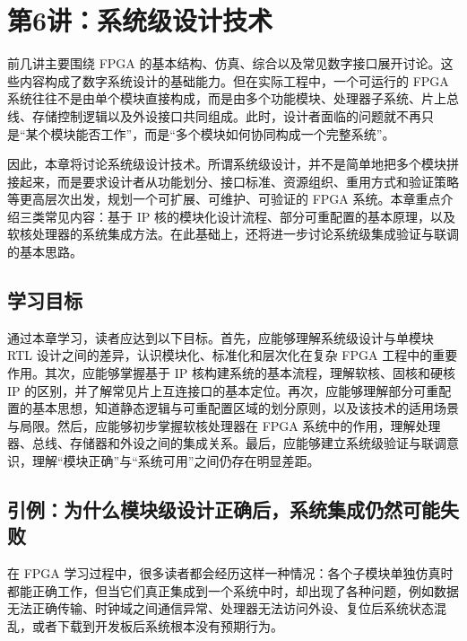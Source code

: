 \chapter{第6讲：系统级设计技术}\label{ux7b2c6ux8bb2ux7cfbux7edfux7ea7ux8bbeux8ba1ux6280ux672f}

前几讲主要围绕 FPGA
的基本结构、仿真、综合以及常见数字接口展开讨论。这些内容构成了数字系统设计的基础能力。但在实际工程中，一个可运行的
FPGA
系统往往不是由单个模块直接构成，而是由多个功能模块、处理器子系统、片上总线、存储控制逻辑以及外设接口共同组成。此时，设计者面临的问题就不再只是``某个模块能否工作''，而是``多个模块如何协同构成一个完整系统''。

因此，本章将讨论系统级设计技术。所谓系统级设计，并不是简单地把多个模块拼接起来，而是要求设计者从功能划分、接口标准、资源组织、重用方式和验证策略等更高层次出发，规划一个可扩展、可维护、可验证的
FPGA 系统。本章重点介绍三类常见内容：基于 IP
核的模块化设计流程、部分可重配置的基本原理，以及软核处理器的系统集成方法。在此基础上，还将进一步讨论系统级集成验证与联调的基本思路。

\section{学习目标}\label{ux5b66ux4e60ux76eeux6807}

通过本章学习，读者应达到以下目标。首先，应能够理解系统级设计与单模块 RTL
设计之间的差异，认识模块化、标准化和层次化在复杂 FPGA
工程中的重要作用。其次，应能够掌握基于 IP
核构建系统的基本流程，理解软核、固核和硬核 IP
的区别，并了解常见片上互连接口的基本定位。再次，应能够理解部分可重配置的基本思想，知道静态逻辑与可重配置区域的划分原则，以及该技术的适用场景与局限。然后，应能够初步掌握软核处理器在
FPGA
系统中的作用，理解处理器、总线、存储器和外设之间的集成关系。最后，应能够建立系统级验证与联调意识，理解``模块正确''与``系统可用''之间仍存在明显差距。

\section{引例：为什么模块级设计正确后，系统集成仍然可能失败}\label{ux5f15ux4f8bux4e3aux4ec0ux4e48ux6a21ux5757ux7ea7ux8bbeux8ba1ux6b63ux786eux540eux7cfbux7edfux96c6ux6210ux4ecdux7136ux53efux80fdux5931ux8d25}

在 FPGA
学习过程中，很多读者都会经历这样一种情况：各个子模块单独仿真时都能正确工作，但当它们真正集成到一个系统中时，却出现了各种问题，例如数据无法正确传输、时钟域之间通信异常、处理器无法访问外设、复位后系统状态混乱，或者下载到开发板后系统根本没有预期行为。

